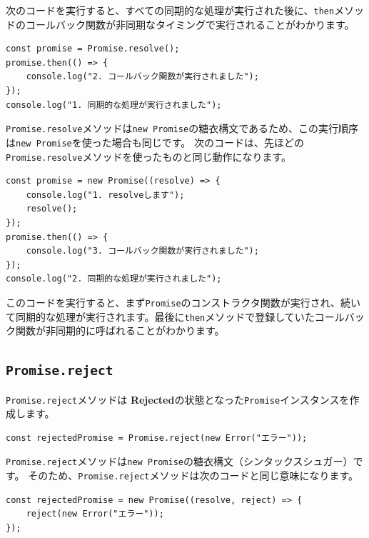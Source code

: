 次のコードを実行すると、すべての同期的な処理が実行された後に、\texttt{then}メソッドのコールバック関数が非同期なタイミングで実行されることがわかります。

\begin{lstlisting}
const promise = Promise.resolve();
promise.then(() => {
    console.log("2. コールバック関数が実行されました");
});
console.log("1. 同期的な処理が実行されました");
\end{lstlisting}

\texttt{Promise.resolve}メソッドは\texttt{new Promise}の糖衣構文であるため、この実行順序は\texttt{new Promise}を使った場合も同じです。
次のコードは、先ほどの\texttt{Promise.resolve}メソッドを使ったものと同じ動作になります。

\begin{lstlisting}
const promise = new Promise((resolve) => {
    console.log("1. resolveします");
    resolve();
});
promise.then(() => {
    console.log("3. コールバック関数が実行されました");
});
console.log("2. 同期的な処理が実行されました");
\end{lstlisting}

このコードを実行すると、まず\texttt{Promise}のコンストラクタ関数が実行され、続いて同期的な処理が実行されます。最後に\texttt{then}メソッドで登録していたコールバック関数が非同期的に呼ばれることがわかります。

\hypertarget{promise-reject}{%
\subsection{\texorpdfstring{\texttt{Promise.reject}}{Promise.reject}}\label{promise-reject}}

\texttt{Promise.reject}メソッドは
\textbf{Rejected}の状態となった\texttt{Promise}インスタンスを作成します。

\begin{lstlisting}
const rejectedPromise = Promise.reject(new Error("エラー"));
\end{lstlisting}

\texttt{Promise.reject}メソッドは\texttt{new Promise}の糖衣構文（シンタックスシュガー）です。
そのため、\texttt{Promise.reject}メソッドは次のコードと同じ意味になります。

\begin{lstlisting}
const rejectedPromise = new Promise((resolve, reject) => {
    reject(new Error("エラー"));
});
\end{lstlisting}

